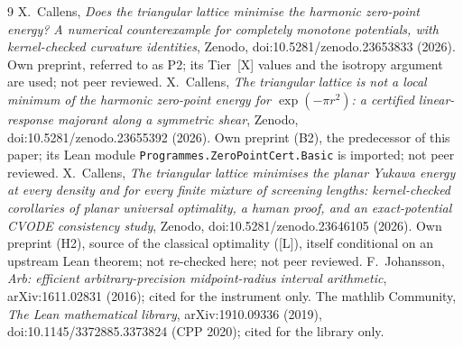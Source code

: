 \documentclass[10pt]{article}
\newcommand{\tier}[1]{\textsf{[#1]}}
\newcommand{\tL}{\tier{L}}
\newcommand{\tX}{\tier{X}}
\begin{document}
\begin{thebibliography}{9}\small
{} X.~Callens, \emph{Does the triangular lattice minimise the harmonic zero-point energy? A numerical counterexample for completely monotone potentials, with kernel-checked curvature identities}, Zenodo, doi:10.5281/zenodo.23653833 (2026). Own preprint, referred to as P2; its Tier~\tX{} values and the isotropy argument are used; not peer reviewed.
 X.~Callens, \emph{The triangular lattice is not a local minimum of the harmonic zero-point energy for $\exp(-\pi r^2)$: a certified linear-response majorant along a symmetric shear}, Zenodo, doi:10.5281/zenodo.23655392 (2026). Own preprint (B2), the predecessor of this paper; its Lean module \texttt{Programmes.ZeroPointCert.Basic} is imported; not peer reviewed.
 X.~Callens, \emph{The triangular lattice minimises the planar Yukawa energy at every density and for every finite mixture of screening lengths: kernel-checked corollaries of planar universal optimality, a human proof, and an exact-potential CVODE consistency study}, Zenodo, doi:10.5281/zenodo.23646105 (2026). Own preprint (H2), source of the classical optimality (\tL), itself conditional on an upstream Lean theorem; not re-checked here; not peer reviewed.
 F.~Johansson, \emph{Arb: efficient arbitrary-precision midpoint-radius interval arithmetic}, arXiv:1611.02831 (2016); cited for the instrument only.
 The mathlib Community, \emph{The Lean mathematical library}, arXiv:1910.09336 (2019), doi:10.1145/3372885.3373824 (CPP 2020); cited for the library only.
\end{thebibliography}
\end{document}
